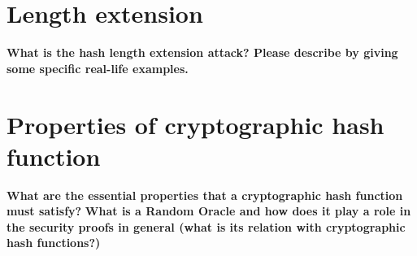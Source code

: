 \documentclass[letterpaper,11pt,notitlepage,fleqn]{article}
\begin{document}
\section{Length extension}
\noindent \textbf{What  is  the  hash  length  extension  attack?  Please  describe  by  giving  some  specific  real-life examples.}

\section{Properties of cryptographic hash function}
\noindent \textbf{What are the essential properties that a cryptographic hash function must satisfy?}
\noindent \textbf{What is a Random Oracle and how does it play a role in the security proofs in general 
(what is its relation with cryptographic hash functions?)}

\medskip
 


\end{document}
